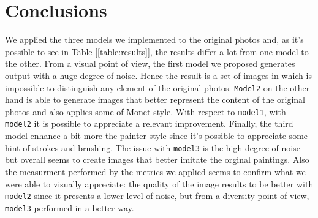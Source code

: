 \documentclass[10pt,twocolumn,letterpaper]{article}
\begin{document}
\section{Conclusions}
We applied the three models we implemented to the original photos and, as it's possible to see in Table [\ref{table:results}], the results differ a lot from one model to the other. From a visual point of view, the first model we proposed generates output with a huge degree of noise. Hence the result is a set of images in which is impossible to distinguish any element of the original photos. \texttt{Model2} on the other hand is able to generate images that better represent the content of the original photos and also applies some of Monet style. With respect to \texttt{model1}, with \texttt{model2} it is possible to appreciate a relevant improvement. Finally, the third model enhance a bit more the painter style since it's possible to appreciate some hint of strokes and brushing. The issue with \texttt{model3} is the high degree of noise but overall seems to create images that better imitate the orginal paintings. Also the measurment performed by the metrics we applied seems to confirm what we were able to visually appreciate: the quality of the image results to be better with \texttt{model2} since it presents a lower level of noise, but from a diversity point of view, \texttt{model3} performed in a better way. 

{\small


}
\end{document}
